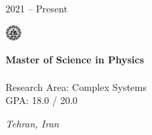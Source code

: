 \documentclass[9pt, purple]{./template/cv} %
\begin{document}
\begin{minipage}{\linewidth}
    \vspace{6mm}
    \begin{minipage}[t]{0.15\linewidth}
        \vspace{-\baselineskip}
        \textcolor{soft}{2021 -- Present} 
    \end{minipage}
    \begin{minipage}[t]{8mm}
        \vspace{-\baselineskip}
        \includegraphics[width=6mm]{img/sharif}\centering
    \end{minipage}
    \begin{minipage}[t]{0.5\linewidth}
        \vspace{-\baselineskip}
        {\textcolor{accentbackground}{\textbf{Master of Science in Physics}}} \\
         \\
        Research Area: Complex Systems\\
        GPA: 18.0 / 20.0
    \end{minipage}
    \hfill
    \begin{minipage}[t]{0.1\linewidth}
        \vspace{-\baselineskip}
        \textcolor{accentbackground}{\textit{Tehran, Iran}} 
    \end{minipage}
    

\end{minipage}
\end{document}
